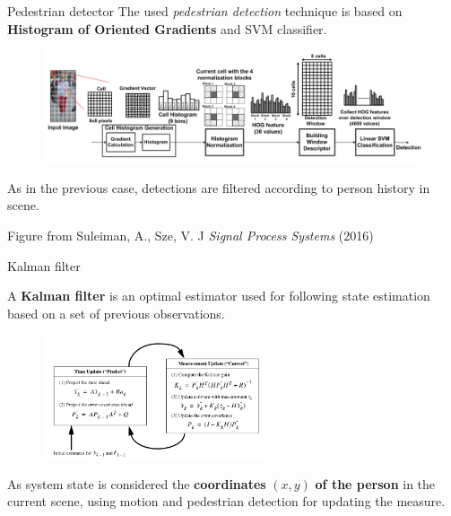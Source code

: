 \documentclass{beamer}
\begin{document}
\begin{tframe}{Pedestrian detector}
The used \emph{pedestrian detection} technique is based on \textbf{Histogram of Oriented Gradients} and SVM classifier.

\begin{figure}[h]
\centering
\includegraphics[width=1\textwidth]{images/hog_detector.jpg}
\end{figure}

As in the previous case, detections are filtered according to person history in scene.

\vspace{0.2cm}
\hfill {\tiny Figure from Suleiman, A., Sze, V. J \emph{Signal Process Systems} (2016)}
\end{tframe}


\begin{tframe}{Kalman filter}

A \textbf{Kalman filter} is an optimal estimator used for following state estimation based on a set of previous observations.
\begin{figure}[h]
\centering
\includegraphics[width=0.6\textwidth]{images/kalmaneq.jpg}
\end{figure}
As system state is considered the \textbf{coordinates} $(x, y)$ \textbf{of the person} in the current scene, using motion and pedestrian detection for updating the measure.
\end{tframe}
\end{document}
